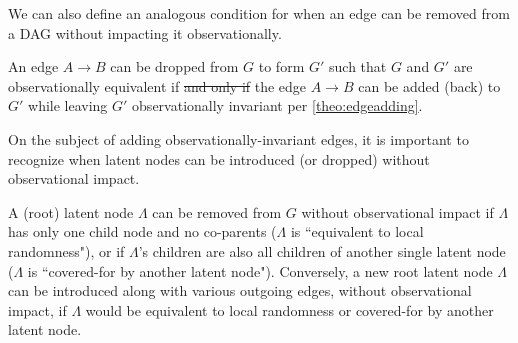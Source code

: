 {We can also define an analogous condition for when an edge can be removed from a DAG without impacting it observationally.
\begin{corollary}\label{cor:edgedropping}
An edge $A\to B$ can be dropped from $G$ to form $G'$ such that $G$ and $G'$ are observationally equivalent if \sout{and only if} the edge $A\to B$ can be added (back) to $G'$ while leaving $G'$ observationally invariant per \cref{theo:edgeadding}.
\end{corollary}

On the subject of adding observationally-invariant edges, it is important to recognize when latent nodes can be introduced (or dropped) without observational impact.
\begin{theorem}\label{theo:latentadding}
A (root) latent node $\Lambda$ can be removed from $G$ without observational impact if $\Lambda$ has only one child node and no co-parents ($\Lambda$ is ``equivalent to local randomness"), or if $\Lambda$'s children are also all children of another single latent node ($\Lambda$ is ``covered-for by another latent node"). Conversely, a new root latent node $\Lambda$ can be introduced along with various outgoing edges, without observational impact, if $\Lambda$ would be equivalent to local randomness or covered-for by another latent node.
\end{theorem}

}
